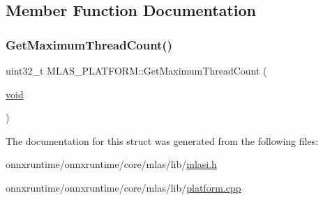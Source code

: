 \subsection{Member Function Documentation}
\mbox{\label{structMLAS__PLATFORM_aaba770e9940e1057a26a65edc523df85}} 
\subsubsection{\texorpdfstring{Get\+Maximum\+Thread\+Count()}{GetMaximumThreadCount()}}
{\footnotesize\ttfamily uint32\+\_\+t M\+L\+A\+S\+\_\+\+P\+L\+A\+T\+F\+O\+R\+M\+::\+Get\+Maximum\+Thread\+Count (\begin{DoxyParamCaption}\item[{\mbox{\hyperlink{mlasi_8h_a88f941d423cb2a819b70a1358982b1a6}{void}}}]{ }\end{DoxyParamCaption})\hspace{0.3cm}{\ttfamily [inline]}}



The documentation for this struct was generated from the following files\+:\begin{DoxyCompactItemize}
\item 
onnxruntime/onnxruntime/core/mlas/lib/\mbox{\hyperlink{mlasi_8h}{mlasi.\+h}}\item 
onnxruntime/onnxruntime/core/mlas/lib/\mbox{\hyperlink{platform_8cpp}{platform.\+cpp}}\end{DoxyCompactItemize}

